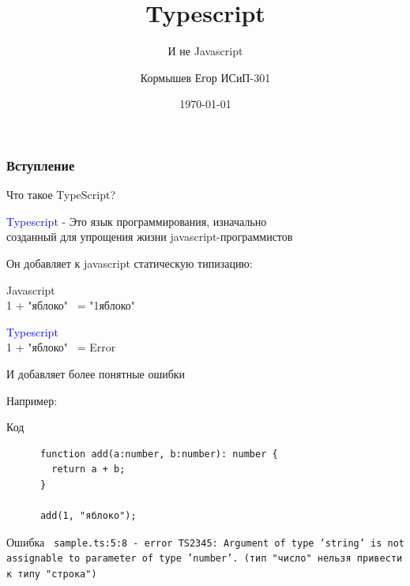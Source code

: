 \documentclass[aspectratio=169]{beamer}
\title[Typescript]{Typescript}
\subtitle{И не Javascript}
\author{Кормышев Егор ИСиП-301}
\date{\today}
\begin{document}
\frame{\titlepage}


\begin{frame}

  \frametitle{Вступление}
  \begin{center}
    \large{Что такое TypeScript?} \\
  \end{center}
  \bigskip
  \bigskip

  \normalsize\textcolor{blue}{Typescript} - Это язык программирования, изначально \\ созданный для упрощения жизни javascript-программистов
  
\end{frame}

\begin{frame}

  \begin{center}    
    Он добавляет к javascript статическую типизацию: 
    
    \bigskip

    \alert{\large{Javascript}} \\
    \bigskip
    \normalsize 1 + "яблоко" \  = "1яблоко"
    \bigskip

    \textcolor{blue}{\large{Typescript}} \\
    \bigskip
    \normalsize 1 + "яблоко" \  = \alert{Error}
    
  \end{center}
  
\end{frame}

\begin{frame}[fragile]
  И добавляет более понятные ошибки

  \bigskip
  
  \small{Например:}

  \begin{block}{Код}
    \begin{verbatim}    
      function add(a:number, b:number): number {
        return a + b;
      }

      add(1, "яблоко");

    \end{verbatim}
  \end{block}

  \begin{alertblock}{Ошибка}
    \texttt{
      sample.ts:5:8 - error TS2345: Argument of type 'string' is not assignable to parameter of type 'number'. (тип "число" нельзя привести к типу "строка")
    }
  \end{alertblock}
  
\end{frame}
\end{document}
